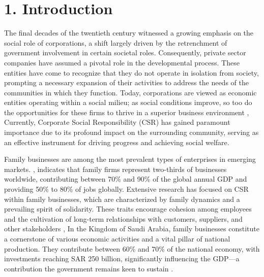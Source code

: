 \documentclass[10pt]{NSP1}
\begin{document}



\maketitle



\section{1. Introduction}

The final decades of the twentieth century witnessed a growing emphasis on the social role of corporations, a shift largely driven by the retrenchment of government involvement in certain societal roles. Consequently, private sector companies have assumed a pivotal role in the developmental process. These entities have come to recognize that they do not operate in isolation from society, prompting a necessary expansion of their activities to address the needs of the communities in which they function. Today, corporations are viewed as economic entities operating within a social milieu; as social conditions improve, so too do the opportunities for these firms to thrive in a superior business environment \cite{ref1}, Currently, Corporate Social Responsibility (CSR) has gained paramount importance due to its profound impact on the surrounding community, serving as an effective instrument for driving progress and achieving social welfare.

Family businesses are among the most prevalent types of enterprises in emerging markets. \cite{ref8}, indicates that family firms represent two-thirds of businesses worldwide, contributing between 70\% and 90\% of the global annual GDP and providing 50\% to 80\% of jobs globally. Extensive research has focused on CSR within family businesses, which are characterized by family dynamics and a prevailing spirit of solidarity. These traits encourage cohesion among employees and the cultivation of long-term relationships with customers, suppliers, and other stakeholders \cite{ref6}, In the Kingdom of Saudi Arabia, family businesses constitute a cornerstone of various economic activities and a vital pillar of national production. They contribute between 60\% and 70\% of the national economy, with investments reaching SAR 250 billion, significantly influencing the GDP—a contribution the government remains keen to sustain \cite{ref7} .
\end{document}
